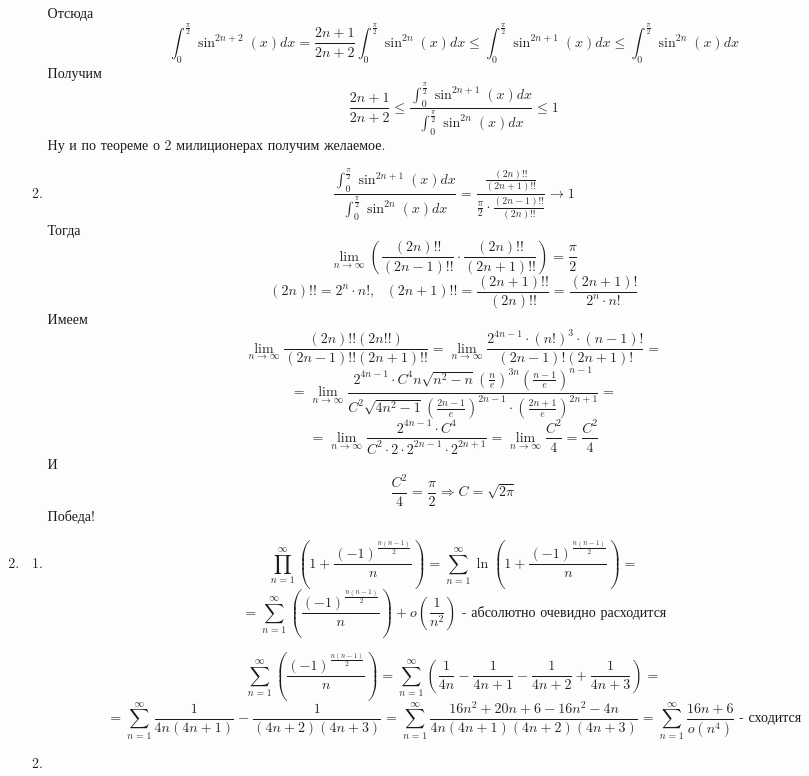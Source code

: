 \documentclass[11pt]{article}
\begin{document}
\begin{enumerate}
\begin{enumerate}
			Отсюда $$ \int_{0}^{\frac{\pi}{2}}\sin^{2n+2}(x)dx= \frac{2n+1}{2n+2}\int_{0}^{\frac{\pi}{2}}\sin^{2n}(x)dx \le \int_{0}^{\frac{\pi}{2}} \sin^{2n+1}(x)dx \le \int_{0}^{\frac{\pi}{2}}\sin^{2n}(x)dx$$
			Получим $$ \frac{2n+1}{2n+2} \le \frac{\int_{0}^{\frac{\pi}{2}} \sin^{2n+1}(x)dx}{\int_{0}^{\frac{\pi}{2}}\sin^{2n}(x)dx} \le 1$$ Ну и по теореме о 2 милиционерах получим желаемое.
			\item $$ \frac{\int_{0}^{\frac{\pi}{2}} \sin^{2n+1}(x)dx}{\int_{0}^{\frac{\pi}{2}}\sin^{2n}(x)dx}= \frac{\frac{(2n)!!}{(2n+1)!!}}{\frac{\pi}{2}\cdot \frac{(2n-1)!!}{(2n)!!}} \to 1$$
			Тогда $$ \lim_{n\to \infty} \left(\frac{(2n)!!}{(2n-1)!!} \cdot \frac{(2n)!!}{(2n+1)!!} \right) = \frac{\pi}{2} $$
			$$ (2n)!! = 2^n\cdot n!,\:\:\:(2n+1)!!  = \frac{(2n+1)!!}{(2n)!!} = \frac{(2n+1)!}{2^n\cdot n!} $$
			Имеем $$ \lim_{n\to \infty} \frac{(2n)!!(2n!!)}{(2n-1)!!(2n+1)!!} = \lim_{n\to \infty} \frac{2^{4n-1}\cdot (n!)^3\cdot (n-1)!}{(2n-1)!(2n+1)!} = $$
			$$ =\lim_{n\to \infty} \frac{2^{4n-1}\cdot C^4n\sqrt{n^2-n}\left(\frac{n}{e}\right)^{3n}\left( \frac{n-1}{e}\right)^{n-1} }{C^2\sqrt{4n^2-1}\left(\frac{2n-1}{e}\right)^{2n-1}\cdot \left(\frac{2n+1}{e}\right)^{2n+1}}=$$
			$$ = \lim_{n\to \infty} \frac{2^{4n-1}\cdot C^4}{C^2\cdot 2\cdot 2^{2n-1}\cdot 2^{2n+1}} = \lim_{n\to \infty} \frac{C^2}{4} = \frac{C^2}{4}$$
			И $$ \frac{C^2}{4} = \frac{\pi}{2} \Rightarrow C=\sqrt{2\pi} $$ Победа!
		\end{enumerate}
	
	\item \begin{enumerate}
		\item 
		
		$$\prod_{n=1}^{\infty} \left(1 + \frac{(-1)^{\frac{n(n-1)}{2}}}{n} \right) =
		\sum_{n=1}^{\infty} \operatorname{ln}\left(1 + \frac{(-1)^{\frac{n(n-1)}{2}}}{n} \right) = $$
		$$ = \sum_{n=1}^{\infty} \left( \frac{(-1)^{\frac{n(n-1)}{2}}}{n}\right) + o \left(\frac{1}{n^2} \right) \text{ - абсолютно очевидно расходится}$$
		
		$$\sum_{n=1}^{\infty} \left( \frac{(-1)^{\frac{n(n-1)}{2}}}{n}\right) = \sum_{n=1}^{\infty} \left(\frac{1}{4n} -\frac{1}{4n+1} -\frac{1}{4n+2} +\frac{1}{4n+3}  \right) =$$ $$ =\sum_{n=1}^{\infty} \frac{1}{4n(4n+1)} - \frac{1}{(4n+2)(4n+3)} = \sum_{n=1}^{\infty} \frac{16n^2 + 20n+6 -16n^2 -4n}{4n(4n+1)(4n+2)(4n+3)} = \sum_{n=1}^{\infty} \frac{16n +6}{o(n^4)} \text{ - сходится}$$
		
		\item    
		

\end{enumerate}
\end{enumerate}
\end{document}
